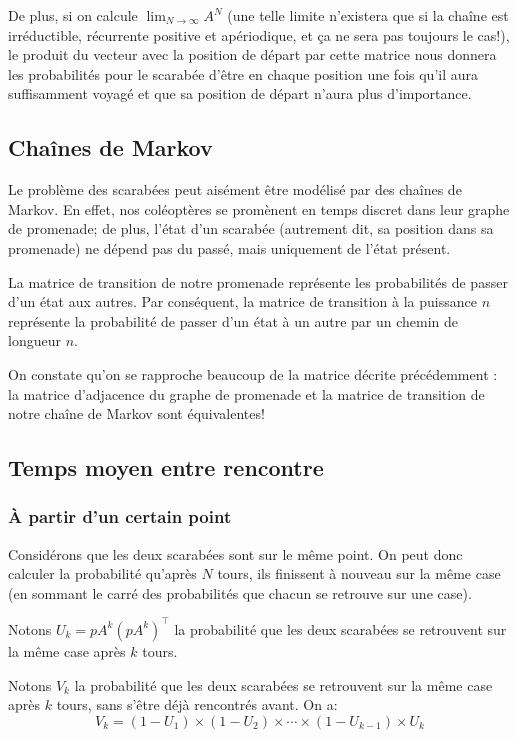 \documentclass{scrartcl}
\begin{document}
  De plus, si on calcule $\lim_{N \to \infty} A^N$ (une telle limite n'existera
  que si la chaîne est irréductible, récurrente positive et apériodique, et ça
  ne sera pas toujours le cas!), le produit du vecteur avec la position de
  départ par cette matrice nous donnera les probabilités pour le scarabée
  d'être en chaque position une fois qu'il aura suffisamment voyagé et que sa
  position de départ n'aura plus d'importance.

  \subsection{Chaînes de Markov}
    Le problème des scarabées peut aisément être modélisé
    par des chaînes de Markov. En effet, nos coléoptères se promènent en temps
    discret dans leur graphe de promenade; de plus, l'état d'un scarabée
    (autrement dit, sa position dans sa promenade) ne dépend pas du passé, mais
    uniquement de l'état présent.

    La matrice de transition de notre promenade représente les probabilités de
    passer d'un état aux autres. Par conséquent, la matrice de transition à la
    puissance $n$ représente la probabilité de passer d'un état à un autre par
    un chemin de longueur $n$.

    On constate qu'on se rapproche beaucoup de la matrice décrite précédemment : la matrice d'adjacence du graphe de promenade et la
    matrice de transition de notre chaîne de Markov sont équivalentes!

  \subsection{Temps moyen entre rencontre}
    \subsubsection{À partir d'un certain point}
      Considérons que les deux scarabées sont sur le même point.  On peut donc
      calculer la probabilité qu'après $N$ tours, ils finissent à nouveau sur
      la même case (en sommant le carré des probabilités que chacun se retrouve
      sur une case).

      Notons $U_k = pA^k(pA^k)^\intercal$ la probabilité que les deux scarabées
      se retrouvent sur la même case après $k$ tours.

      Notons $V_k$ la probabilité que les deux scarabées se retrouvent sur la
      même case après $k$ tours, sans s'être déjà rencontrés avant. On a:
        \[V_k = (1 - U_1) \times (1 - U_2) \times \cdots \times (1 - U_{k - 1})
        \times U_k\]
\end{document}
